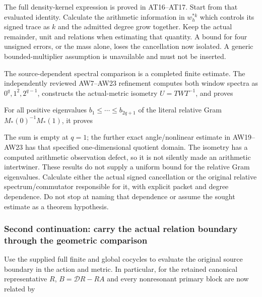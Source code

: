 The full density-kernel expression is proved in AT16--AT17. Start from
that evaluated identity. Calculate the arithmetic information in
\(w_h^{*k}\) which controls its signed trace as \(k\) and the admitted
degree grow together. Keep the actual remainder, unit and relations when
estimating that quantity. A bound for four unsigned errors, or the mass
alone, loses the cancellation now isolated. A generic bounded-multiplier
assumption is unavailable and must not be inserted.

The source-dependent spectral comparison is a completed finite estimate.
The independently reviewed AW7--AW23 refinement computes both window
spectra as \(0^q,1^2,2^{q-1}\), constructs the actual-metric isometry
\(U=TWT^{-1}\), and proves


For all positive eigenvalues \(b_1\le\cdots\le b_{2q+1}\) of the literal
relative Gram \(M_*(0)^{-1}M_*(1)\), it proves


The sum is empty at \(q=1\); the further exact angle/nonlinear estimate
in AW19--AW23 has that specified one-dimensional quotient domain. The
isometry has a computed arithmetic observation defect, so it is not
silently made an arithmetic intertwiner. These results do not supply a
uniform bound for the relative Gram eigenvalues. Calculate either the
actual signed cancellation or the original relative spectrum/commutator
responsible for it, with explicit packet and degree dependence. Do not
stop at naming that dependence or assume the sought estimate as a
theorem hypothesis.

\subsubsection{Second continuation: carry the actual relation boundary
through the geometric
comparison}\label{second-continuation-carry-the-actual-relation-boundary-through-the-geometric-comparison}

Use the supplied full finite and global cocycles to evaluate the
original source boundary in the action and metric. In particular, for
the retained canonical representative \(R\), \(B=\mathscr D R-RA\) and
every nonresonant primary block are now related by

